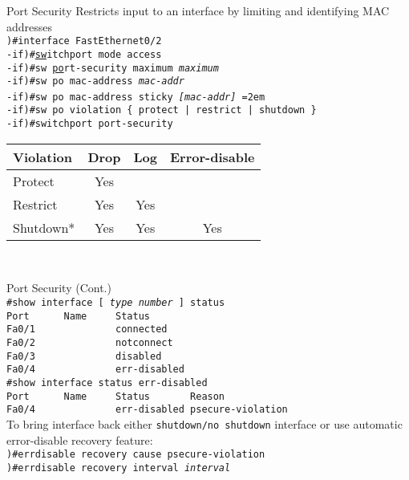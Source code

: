 \begin{frame}{Port Security}
	Restricts input to an interface by limiting and identifying MAC addresses
	\vspace{0.3cm}
	\texttt{
		\\\pause )\#interface FastEthernet0/2
		\\\pause -if)\#\underline{sw}itchport mode access
		\\\pause -if)\#sw \underline{po}rt-security maximum \textit{maximum}
		\\\pause -if)\#sw po mac-address \textit{mac-addr}
		\\\pause -if)\#sw po mac-address sticky \pause\textit{[mac-addr]}
		\hangindent=2em{
		\\\pause -if)\#sw po violation \{ protect | restrict | shutdown \}}
		\\\pause -if)\#switchport port-security
	}
	\\\vspace{0.1cm}\hspace{1.5cm}
	\begin{tabular}{l*{3}c}
		        \pause Violation	&Drop	&Log	&Error-disable
		\\\hline\pause Protect		&Yes
		\\      \pause Restrict		&Yes	&Yes
		\\      \pause Shutdown*		&Yes	&Yes	&Yes
	\end{tabular}\\
\end{frame}

\begin{frame}{Port Security (Cont.)}
	\texttt{
		\\\#show interface [\textit{ type number }] status
		\\\pause Port~~~~~~Name~~~~~Status
		\\       Fa0/1~~~~~~~~~~~~~~connected
		\\       Fa0/2~~~~~~~~~~~~~~notconnect
		\\       Fa0/3~~~~~~~~~~~~~~disabled
		\\       Fa0/4~~~~~~~~~~~~~~err-disabled\vspace{0.3cm}
		\\\pause \#show interface status err-disabled
		\\\pause Port~~~~~~Name~~~~~Status~~~~~~~Reason
		\\       Fa0/4~~~~~~~~~~~~~~err-disabled~psecure-violation
	}
	\\\vspace{0.3cm}\pause
	To bring interface back either \texttt{shutdown/no shutdown} interface or use automatic error-disable recovery feature:
	\pause\vspace{0.3cm}
	\texttt{
		\\)\#errdisable recovery cause psecure-violation
		\\)\#errdisable recovery interval \textit{interval}
	}\\
\end{frame}
